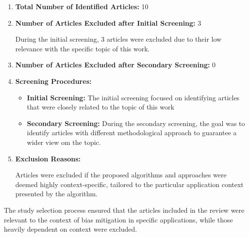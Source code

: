 \documentclass{article}
\begin{document}
    \begin{enumerate}
        \item \textbf{Total Number of Identified Articles:} 10
        \item \textbf{Number of Articles Excluded after Initial Screening:} 3
        
        During the initial screening, 3 articles were excluded due to their low relevance with the specific topic of this work.
        
        \item \textbf{Number of Articles Excluded after Secondary Screening:} 0
        
        \item \textbf{Screening Procedures:}
        
        \begin{itemize}
            \item \textbf{Initial Screening:} The initial screening focused on identifying articles that were closely related to the topic of this work
            
            \item \textbf{Secondary Screening:} During the secondary screening, the goal was to identify articles with different methodological approach to guarantee a wider view om the topic.
        \end{itemize}
        
        \item \textbf{Exclusion Reasons:}
        
        Articles were excluded if the proposed algorithms and approaches were deemed highly context-specific, tailored to the particular application context presented by the algorithm.
    
    \end{enumerate}
    
    The study selection process ensured that the articles included in the review were relevant to the context of bias mitigation in specific applications, while those heavily dependent on context were excluded.
\end{document}
